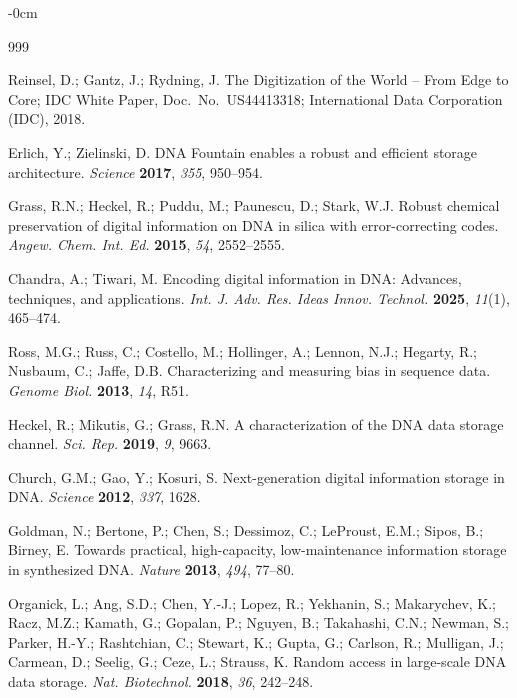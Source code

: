\documentclass[entropy,article,submit,moreauthors]{Definitions/mdpi}
\begin{document}
\begin{adjustwidth}{-\extralength}{0cm}


\begin{thebibliography}{999}

Reinsel, D.; Gantz, J.; Rydning, J. The Digitization of the World -- From Edge to Core; IDC White Paper, Doc.\ No.\ US44413318; International Data Corporation (IDC), 2018.

Erlich, Y.; Zielinski, D. DNA Fountain enables a robust and efficient storage architecture. {\em Science} {\bf 2017}, {\em 355}, 950--954.

Grass, R.N.; Heckel, R.; Puddu, M.; Paunescu, D.; Stark, W.J. Robust chemical preservation of digital information on DNA in silica with error-correcting codes. {\em Angew. Chem. Int. Ed.} {\bf 2015}, {\em 54}, 2552--2555.

Chandra, A.; Tiwari, M. Encoding digital information in DNA: Advances, techniques, and applications. {\em Int. J. Adv. Res. Ideas Innov. Technol.} {\bf 2025}, {\em 11}(1), 465--474.

Ross, M.G.; Russ, C.; Costello, M.; Hollinger, A.; Lennon, N.J.; Hegarty, R.; Nusbaum, C.; Jaffe, D.B. Characterizing and measuring bias in sequence data. {\em Genome Biol.} {\bf 2013}, {\em 14}, R51.

Heckel, R.; Mikutis, G.; Grass, R.N. A characterization of the DNA data storage channel. {\em Sci. Rep.} {\bf 2019}, {\em 9}, 9663.

Church, G.M.; Gao, Y.; Kosuri, S. Next-generation digital information storage in DNA. {\em Science} {\bf 2012}, {\em 337}, 1628.

Goldman, N.; Bertone, P.; Chen, S.; Dessimoz, C.; LeProust, E.M.; Sipos, B.; Birney, E. Towards practical, high-capacity, low-maintenance information storage in synthesized DNA. {\em Nature} {\bf 2013}, {\em 494}, 77--80.

Organick, L.; Ang, S.D.; Chen, Y.-J.; Lopez, R.; Yekhanin, S.; Makarychev, K.; Racz, M.Z.; Kamath, G.; Gopalan, P.; Nguyen, B.; Takahashi, C.N.; Newman, S.; Parker, H.-Y.; Rashtchian, C.; Stewart, K.; Gupta, G.; Carlson, R.; Mulligan, J.; Carmean, D.; Seelig, G.; Ceze, L.; Strauss, K. Random access in large-scale DNA data storage. {\em Nat. Biotechnol.} {\bf 2018}, {\em 36}, 242--248.


\end{thebibliography}
\end{adjustwidth}
\end{document}
